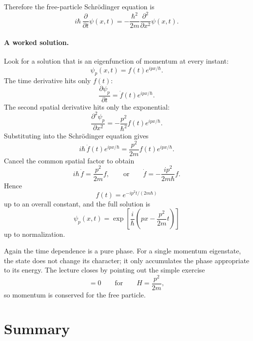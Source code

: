 Therefore the free-particle Schr\"odinger equation is
\begin{equation}
i\hbar\,\frac{\partial}{\partial t}\psi(x,t)
=
-\frac{\hbar^2}{2m}\frac{\partial^2}{\partial x^2}\psi(x,t).
\end{equation}

\paragraph{A worked solution.}
Look for a solution that is an eigenfunction of momentum at every instant:
\begin{equation}
\psi_p(x,t)=f(t)e^{ipx/\hbar}.
\end{equation}
The time derivative hits only $f(t)$:
\begin{equation}
\frac{\partial \psi_p}{\partial t}
=
\dot f(t)e^{ipx/\hbar}.
\end{equation}
The second spatial derivative hits only the exponential:
\begin{equation}
\frac{\partial^2 \psi_p}{\partial x^2}
=
-\frac{p^2}{\hbar^2}f(t)e^{ipx/\hbar}.
\end{equation}
Substituting into the Schr\"odinger equation gives
\begin{equation}
i\hbar\,\dot f(t)e^{ipx/\hbar}
=
\frac{p^2}{2m}f(t)e^{ipx/\hbar}.
\end{equation}
Cancel the common spatial factor to obtain
\begin{equation}
i\hbar\,\dot f=\frac{p^2}{2m}f,
\qquad\text{or}\qquad
\dot f=-\frac{i p^2}{2m\hbar}f.
\end{equation}
Hence
\begin{equation}
f(t)=e^{-ip^2 t/(2m\hbar)}
\end{equation}
up to an overall constant, and the full solution is
\begin{equation}
\psi_p(x,t)
=
\exp\!\left[\frac{i}{\hbar}\left(px-\frac{p^2}{2m}t\right)\right]
\end{equation}
up to normalization.

Again the time dependence is a pure phase. For a single momentum eigenstate, the state does not change its character; it only accumulates the phase appropriate to its energy. The lecture closes by pointing out the simple exercise
\begin{equation}
[p,H]=0
\qquad\text{for}\qquad
H=\frac{p^2}{2m},
\end{equation}
so momentum is conserved for the free particle.

\section{Summary}

